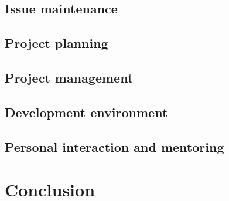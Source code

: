 \documentclass[12pt]{scrartcl}
\let\oldsection\section
\renewcommand\section{\clearpage\oldsection}
\begin{document}
\subsection{Issue maintenance}

\subsection{Project planning}

\subsection{Project management}

\subsection{Development environment}

\subsection{Personal interaction and mentoring}

\section{Conclusion}

\printbibliography
\end{document}
